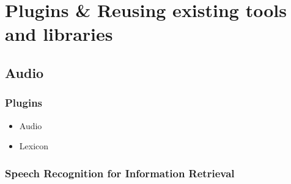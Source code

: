 \documentclass{beamer}
\begin{document}
%


\section[Plugins]{Plugins \& Reusing existing tools and libraries}

\subsection{Audio}
%
%
%
%




\begin{frame}
\frametitle{Plugins}
\begin{itemize}
	\item Audio
	\item Lexicon
\end{itemize}

\end{frame}

\subsubsection[ASR]{Speech Recognition for Information Retrieval}
\end{document}
